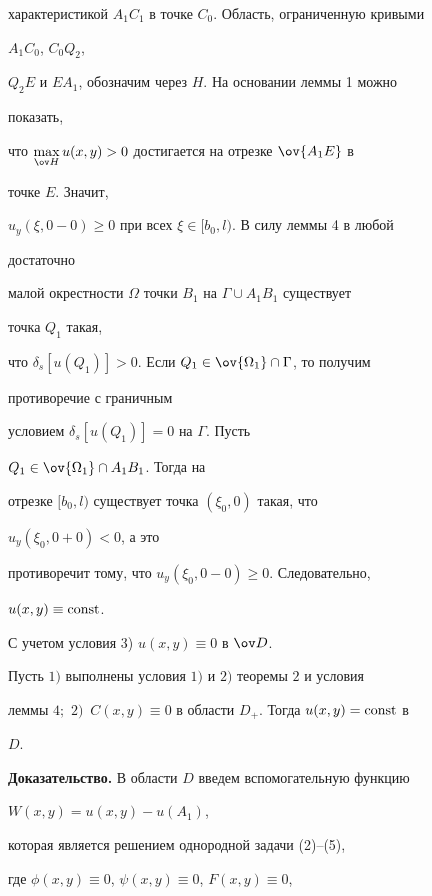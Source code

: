 характеристикой $A_1C_1$ в точке $C_0$. Область, ограниченную кривыми 


$A_1C_0$, $C_0Q_2$, 


$Q_2E$ и $E A_1$, обозначим через $H$. На основании леммы 1 можно 


показать, 


что $\max\limits_{\ov H}u(x,y)>0$ достигается на отрезке $\ov{A_1E}$ в 


точке $E$. Значит, 


$u_y(\xi,0-0)\ge0$ при всех $\xi\in[b_0,l)$. В силу леммы 4 в любой 


достаточно 


малой окрестности $\Omega$ точки $B_1$ на $\Gamma\cup A_1B_1$ существует 


точка $Q_1$ такая, 


что $\delta_s[u(Q_1)]>0$. Если $Q_1\in\ov{\Omega_1}\cap\Gamma$, то получим 


противоречие с граничным 


условием $\delta_s[u(Q_1)]=0$ на $\Gamma$. Пусть 


$Q_1\in\ov{\Omega_1}\cap A_1B_1$. Тогда на 


отрезке $[b_0,l)$ существует точка $(\xi_0,0)$ такая, что 


$u_y(\xi_0,0+0)<0$, а это 


противоречит тому, что $u_y(\xi_0,0-0)\ge0$. Следовательно, 


$u(x,y)\equiv\operatorname{const}$. 


С учетом условия 3)\; $u(x,y)\equiv0$ в $\ov D$. 


 


\begin{thm} 


Пусть $1)$ выполнены условия $1)$ и $2)$ теоремы $2$ и условия 


леммы $4;$ $2)$~$C(x,y){\equiv}0$ в области $D_+$. Тогда $u(x,y)=\operatorname{const}$ в 


$D$. 


\end{thm} 


 


{\bf Доказательство.} В области $D$ введем вспомогательную функцию 


$W(x,y)=u(x,y)-u(A_1)$, 


которая является решением однородной задачи (2)--(5), 


где $\phi(x,y)\equiv0$, $\psi(x,y)\equiv0$, $F(x,y)\equiv0$, 


